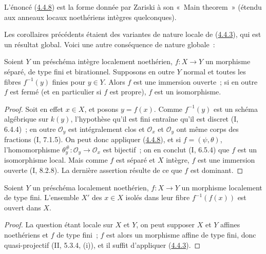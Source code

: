 L'énoncé (\hyperref[III.4.4.8-fr]{4.4.8}) est la forme donnée par Zariski à
son «~Main theorem~» (étendu aux anneaux locaux noethériens intègres
quelconques).

Les corollaires précédents étaient des variantes de nature locale de
(\hyperref[III.4.4.3-fr]{4.4.3}), qui est un résultat global. Voici une autre
conséquence de nature globale~:

\begin{corollary}[4.4.9]
\label{III.4.4.9-fr}
Soient $Y$ un préschéma intègre localement noethérien, $f:X\to Y$ un
morphisme séparé, de type fini et birationnel. Supposons en outre $Y$ normal
et toutes les fibres $f^{-1}(y)$ finies pour $y\in Y$. Alors $f$ est une
immersion ouverte~; si en outre $f$ est fermé (et en particulier si $f$ est
propre), $f$ est un isomorphisme.
\end{corollary}

\begin{proof}
Soit en effet $x\in X$, et posons $y=f(x)$. Comme $f^{-1}(y)$ est un schéma
algébrique sur $k(y)$, l'hypothèse qu'il est fini entraîne qu'il est discret
(I, 6.4.4)~; en outre $\mathcal O_y$ est intégralement clos et
$\mathcal O_x$ et $\mathcal O_y$ ont même corps des fractions (I, 7.1.5).
On peut donc appliquer (\hyperref[III.4.4.8-fr]{4.4.8}), et si
$f=(\psi,\theta)$, l'homomorphisme
$\theta_y^\#:\mathcal O_y\to\mathcal O_x$ est bijectif~; on en conclut
(I, 6.5.4) que $f$ est un isomorphisme local. Mais comme $f$ est séparé et
$X$ intègre, $f$ est une immersion ouverte (I, 8.2.8). La dernière assertion
résulte de ce que $f$ est dominant.
\end{proof}

\begin{proposition}[4.4.10]
\label{III.4.4.10-fr}
Soient $Y$ un préschéma localement noethérien, $f:X\to Y$ un morphisme
localement de type fini. L'ensemble $X'$ des $x\in X$ isolés dans leur fibre
$f^{-1}(f(x))$ est ouvert dans $X$.
\end{proposition}

\begin{proof}
La question étant locale sur $X$ et $Y$, on peut supposer $X$ et $Y$ affines
noethériens et $f$ de type fini~; $f$ est alors un morphisme affine de type
fini, donc quasi-projectif (II, 5.3.4, (i)), et il suffit d'appliquer
(\hyperref[III.4.4.3-fr]{4.4.3}).
\end{proof}

